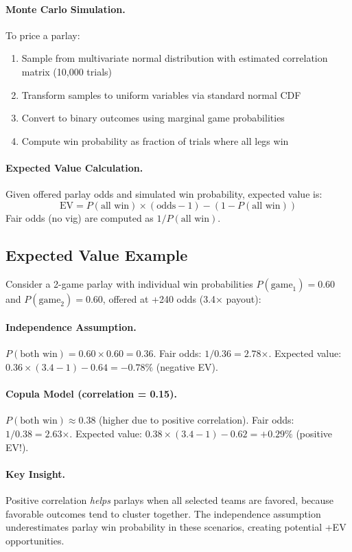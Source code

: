 \paragraph{Monte Carlo Simulation.}
To price a parlay:
\begin{enumerate}
  \item Sample from multivariate normal distribution with estimated correlation matrix (10,000 trials)
  \item Transform samples to uniform variables via standard normal CDF
  \item Convert to binary outcomes using marginal game probabilities
  \item Compute win probability as fraction of trials where all legs win
\end{enumerate}

\paragraph{Expected Value Calculation.}
Given offered parlay odds and simulated win probability, expected value is:
\[
\text{EV} = P(\text{all win}) \times (\text{odds} - 1) - (1 - P(\text{all win}))
\]
Fair odds (no vig) are computed as $1 / P(\text{all win})$.

\subsection{Expected Value Example}
Consider a 2-game parlay with individual win probabilities $P(\text{game}_1) = 0.60$ and $P(\text{game}_2) = 0.60$, offered at +240 odds (3.4× payout):

\paragraph{Independence Assumption.}
$P(\text{both win}) = 0.60 \times 0.60 = 0.36$. Fair odds: $1/0.36 = 2.78$×. Expected value: $0.36 \times (3.4 - 1) - 0.64 = -0.78\%$ (negative EV).

\paragraph{Copula Model (correlation = 0.15).}
$P(\text{both win}) \approx 0.38$ (higher due to positive correlation). Fair odds: $1/0.38 = 2.63$×. Expected value: $0.38 \times (3.4 - 1) - 0.62 = +0.29\%$ (positive EV!).

\paragraph{Key Insight.}
Positive correlation \textit{helps} parlays when all selected teams are favored, because favorable outcomes tend to cluster together. The independence assumption underestimates parlay win probability in these scenarios, creating potential +EV opportunities.

